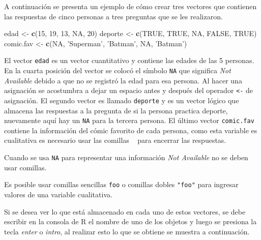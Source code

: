 \documentclass[10pt,]{krantz}
\makeatletter
\newenvironment{Shaded}{\begin{snugshade}}{\end{snugshade}}
\newcommand{\KeywordTok}[1]{\textcolor[rgb]{0.13,0.29,0.53}{\textbf{{#1}}}}
\newcommand{\DecValTok}[1]{\textcolor[rgb]{0.00,0.00,0.81}{{#1}}}
\newcommand{\StringTok}[1]{\textcolor[rgb]{0.31,0.60,0.02}{{#1}}}
\newcommand{\OtherTok}[1]{\textcolor[rgb]{0.56,0.35,0.01}{{#1}}}
\newcommand{\NormalTok}[1]{{#1}}
\let\proglang=\textsf
\newenvironment{kframe}{%
\medskip{}
\setlength{\fboxsep}{.8em}
 \def\at@end@of@kframe{}%
 \ifinner\ifhmode%
  \def\at@end@of@kframe{\end{minipage}}%
  \begin{minipage}{\columnwidth}%
 \fi\fi%
 \def\FrameCommand##1{\hskip\@totalleftmargin \hskip-\fboxsep
 \colorbox{shadecolor}{##1}\hskip-\fboxsep
     \hskip-\linewidth \hskip-\@totalleftmargin \hskip\columnwidth}%
 \MakeFramed {\advance\hsize-\width
   \@totalleftmargin\z@ \linewidth\hsize
   \@setminipage}}%
 {\par\unskip\endMakeFramed%
 \at@end@of@kframe}
\renewenvironment{Shaded}{\begin{kframe}}{\end{kframe}}
\let\BeginKnitrBlock\begin \let\EndKnitrBlock\end
\makeatother
\begin{document}
A continuación se presenta un ejemplo de cómo crear tres vectores que
contienen las respuestas de cinco personas a tres preguntas que se les
realizaron.

\begin{Shaded}
\begin{Highlighting}[]
\NormalTok{edad <-}\StringTok{ }\KeywordTok{c}\NormalTok{(}\DecValTok{15}\NormalTok{, }\DecValTok{19}\NormalTok{, }\DecValTok{13}\NormalTok{, }\OtherTok{NA}\NormalTok{, }\DecValTok{20}\NormalTok{)}
\NormalTok{deporte <-}\StringTok{ }\KeywordTok{c}\NormalTok{(}\OtherTok{TRUE}\NormalTok{, }\OtherTok{TRUE}\NormalTok{, }\OtherTok{NA}\NormalTok{, }\OtherTok{FALSE}\NormalTok{, }\OtherTok{TRUE}\NormalTok{)}
\NormalTok{comic.fav <-}\StringTok{ }\KeywordTok{c}\NormalTok{(}\OtherTok{NA}\NormalTok{, }\StringTok{'Superman'}\NormalTok{, }\StringTok{'Batman'}\NormalTok{, }\OtherTok{NA}\NormalTok{, }\StringTok{'Batman'}\NormalTok{)}
\end{Highlighting}
\end{Shaded}

El vector \texttt{edad} es un vector cuantitativo y contiene las edades
de las 5 personas. En la cuarta posición del vector se colocó el símbolo
\texttt{NA} que significa \textit{Not Available} debido a que no se
registró la edad para esa persona. Al hacer una asignación se acostumbra
a dejar un espacio antes y después del operador \texttt{\textless{}-} de
asignación. El segundo vector es llamado \texttt{deporte} y es un vector
lógico que almacena las respuestas a la pregunta de si la persona
practica deporte, nuevamente aquí hay un \texttt{NA} para la tercera
persona. El último vector \texttt{comic.fav} contiene la información del
cómic favorito de cada persona, como esta variable es cualitativa es
necesario usar las comillas
\texttt{\textquotesingle{}\ \textquotesingle{}} para encerrar las
respuestas.

\BeginKnitrBlock{rmdwarning}
Cuando se usa \texttt{NA} para representar una información
\textit{Not Available} no se deben usar comillas.
\EndKnitrBlock{rmdwarning}

\BeginKnitrBlock{rmdnote}
Es posible usar comillas sencillas
\texttt{\textquotesingle{}foo\textquotesingle{}} o comillas dobles
\texttt{"foo"} para ingresar valores de una variable cualitativa.
\EndKnitrBlock{rmdnote}

Si se desea ver lo que está almacenado en cada uno de estos vectores, se
debe escribir en la consola de \proglang{R} el nombre de uno de los
objetos y luego se presiona la tecla \textit{enter} o \textit{intro}, al
realizar esto lo que se obtiene se muestra a continuación.
\end{document}

